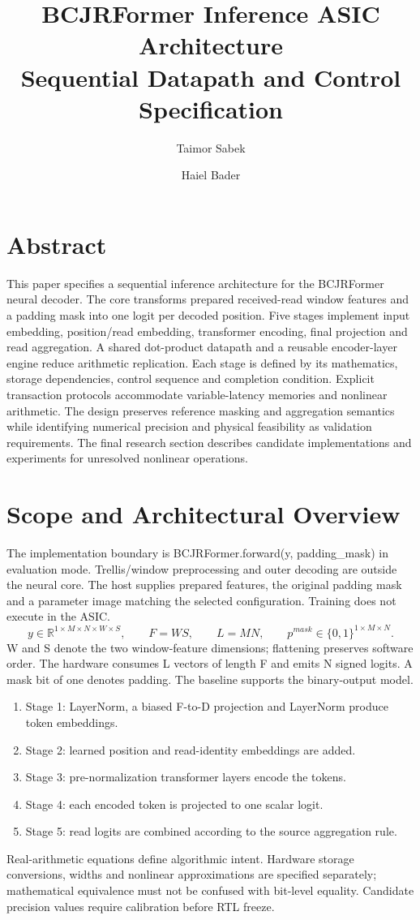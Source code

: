\documentclass[11pt,a4paper]{article}
\title{\textbf{BCJRFormer Inference ASIC Architecture}\\\large Sequential Datapath and Control Specification}
\author{Taimor Sabek \and Haiel Bader}
\date{}
\begin{document}
\maketitle

\section{Abstract}
This paper specifies a sequential inference architecture for the BCJRFormer neural decoder. The core transforms prepared received-read window features and a padding mask into one logit per decoded position. Five stages implement input embedding, position/read embedding, transformer encoding, final projection and read aggregation. A shared dot-product datapath and a reusable encoder-layer engine reduce arithmetic replication. Each stage is defined by its mathematics, storage dependencies, control sequence and completion condition. Explicit transaction protocols accommodate variable-latency memories and nonlinear arithmetic. The design preserves reference masking and aggregation semantics while identifying numerical precision and physical feasibility as validation requirements. The final research section describes candidate implementations and experiments for unresolved nonlinear operations.

\section{Scope and Architectural Overview}
The implementation boundary is BCJRFormer.forward(y, padding\_mask) in evaluation mode. Trellis/window preprocessing and outer decoding are outside the neural core. The host supplies prepared features, the original padding mask and a parameter image matching the selected configuration. Training does not execute in the ASIC.
\[
y\in\mathbb{R}^{1\times M\times N\times W\times S},\qquad
F=WS,\qquad L=MN,\qquad
p^{mask}\in\{0,1\}^{1\times M\times N}.
\]
W and S denote the two window-feature dimensions; flattening preserves software order. The hardware consumes L vectors of length F and emits N signed logits. A mask bit of one denotes padding. The baseline supports the binary-output model.
\begin{enumerate}
\item Stage 1: LayerNorm, a biased F-to-D projection and LayerNorm produce token embeddings.
\item Stage 2: learned position and read-identity embeddings are added.
\item Stage 3: pre-normalization transformer layers encode the tokens.
\item Stage 4: each encoded token is projected to one scalar logit.
\item Stage 5: read logits are combined according to the source aggregation rule.
\end{enumerate}
Real-arithmetic equations define algorithmic intent. Hardware storage conversions, widths and nonlinear approximations are specified separately; mathematical equivalence must not be confused with bit-level equality. Candidate precision values require calibration before RTL freeze.
\end{document}

